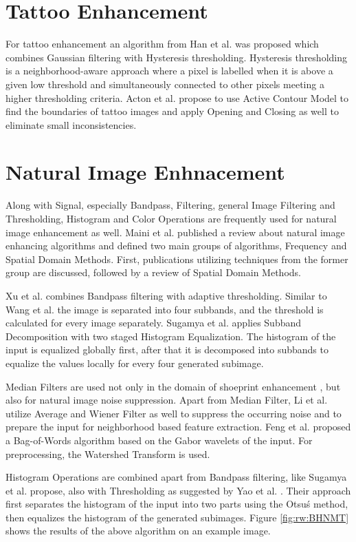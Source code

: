 \documentclass[draft,final]{vutinfth} %
\begin{document}
\section*{Tattoo Enhancement}

For tattoo enhancement an algorithm from Han et al. \cite{han2013tattoo} was proposed which combines Gaussian filtering with Hysteresis thresholding. 
Hysteresis thresholding is a neighborhood-aware approach where a pixel is labelled when it is above a given low threshold and simultaneously connected to other pixels meeting a higher thresholding criteria.
Acton et al. \cite{acton2008matching} propose to use Active Contour Model to find the boundaries of tattoo images and apply Opening and Closing as well to eliminate small inconsistencies.

\section*{Natural Image Enhnacement}
\par
Along with Signal, especially Bandpass, Filtering, general Image Filtering and Thresholding, Histogram and Color Operations are frequently used for natural image enhancement as well.
Maini et al. \cite{maini2010comprehensive} published a review about natural image enhancing algorithms and defined two main groups of algorithms, Frequency and Spatial Domain Methods.
First, publications utilizing techniques from the former group are discussed, followed by a review of Spatial Domain Methods. 
\par
Xu et al. \cite{xu2016image} combines Bandpass filtering with adaptive thresholding.
Similar to Wang et al. \cite{wang2014enhanced} the image is separated into four subbands, and the threshold is calculated for every image separately.
Sugamya et al. \cite{sugamya2016image} applies Subband Decomposition with two staged Histogram Equalization.
The histogram of the input is equalized globally first, after that it is decomposed into subbands to equalize the values locally for every four generated subimage.
\par
Median Filters are used not only in the domain of shoeprint enhancement \cite{alizadeh2017automatic}, but also for natural image noise suppression.
Apart from Median Filter, Li et al. \cite{li2014rapid} utilize Average and Wiener Filter as well to suppress the occurring noise and to prepare the input for neighborhood based feature extraction.
Feng et al. \cite{feng2011bag} proposed a Bag-of-Words algorithm based on the Gabor wavelets of the input. 
For preprocessing, the Watershed Transform is used.
\par
Histogram Operations are combined apart from Bandpass filtering, like Sugamya et al. \cite{sugamya2016image} propose, also with Thresholding as suggested by Yao et al. \cite{yao2016image}. 
Their approach first separates the histogram of the input into two parts using the Otsu\'s method, then equalizes the histogram of the generated subimages. 
Figure \ref{fig:rw:BHNMT} shows the results of the above algorithm on an example image.
\end{document}
